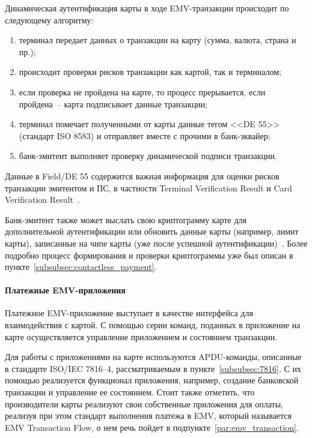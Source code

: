 Динамическая аутентификация карты в ходе EMV-транзакции происходит по следующему алгоритму:

\begin{enumerate}
    \item терминал передает данных о транзакции на карту (сумма, валюта, страна и пр.);
    \item происходит проверки рисков транзакции как картой, так и терминалом;
    \item если проверка не пройдена на карте, то процесс прерывается, если пройдена~-- карта подписывает данные транзакции;
    \item терминал помечает полученными от карты данные тегом <<DE 55>> (стандарт ISO 8583) и отправляет вместе с прочими в банк-эквайер;
    \item банк-эмитент выполняет проверку динамической подписи транзакции.
\end{enumerate}

Данные в Field/DE 55 содержится важная информация для оценки рисков транзакции  эмитентом и ПС, в частности Terminal Verification Result и Card Verification Result~\cite{emv_card_mechanism}.

Банк-эмитент также может выслать свою криптограмму карте для дополнительной аутентификации или обновить данные карты (например, лимит карты), записанные на чипе карты (уже после успешной аутентификации)~\cite{emv_book_2}.
Более подробно процесс формирования и проверки криптограммы уже был описан в пункте~\ref{subsubsec:contactless_payment}.


\paragraph{Платежные EMV-приложения}

Платежное EMV-приложение выступает в качестве интерфейса для взаимодействия с картой.
С помощью серии команд, поданных в приложение на карте осуществляется управление приложением и состоянием транзакции.

Для работы с приложениями на карте используются APDU-команды, описанные в стандарте ISO/IEC 7816--4, рассматриваемым в пункте~\ref{subsubsec:7816}.
С их помощью реализуется функционал приложения, например, создание банковской транзакции и управление ее состоянием.
Стоит также отметить, что производители карты реализуют свои собственные приложения для оплаты, реализуя при этом стандарт выполнения платежа в EMV, который называется EMV Transaction Flow, о нем речь пойдет в подпункте~\ref{par:emv_transaction}.

